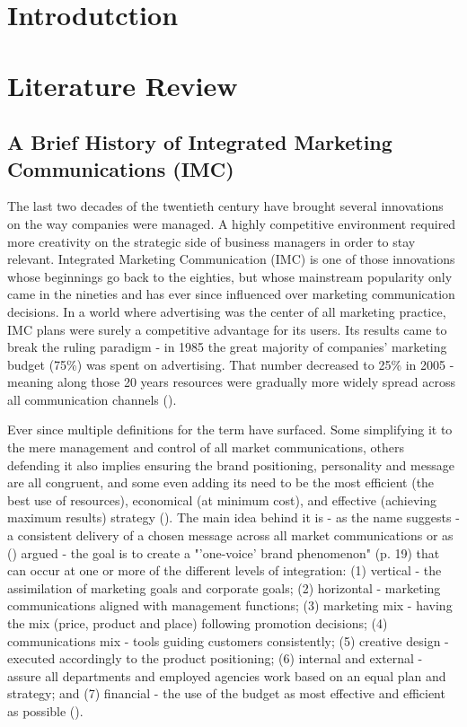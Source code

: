\documentclass[12pt]{article}
\begin{document}
\section{Introdutction}\label{intro}

\newpage	
\section{Literature Review}\label{review}
\subsection{A Brief History of Integrated Marketing Communications (IMC)}\label{IMC}
The last two decades of the twentieth century have brought several innovations on the way companies were managed. A highly competitive environment required more creativity on the strategic side of business managers in order to stay relevant. Integrated Marketing Communication (IMC) is one of those innovations whose beginnings go back to the eighties, but whose mainstream popularity only came in the nineties and has ever since influenced over marketing communication decisions. In a world where advertising was the center of all marketing practice, IMC plans were surely a competitive advantage for its users. Its results came to break the ruling paradigm - in 1985 the great majority  of companies' marketing budget (75\%) was spent on advertising. That number decreased to 25\% in 2005 - meaning along those 20 years resources were gradually more widely spread across all communication channels (\cite{holm}).  

Ever since multiple definitions for the term have surfaced. Some simplifying it to the mere management and control of all market communications, others defending it also implies ensuring the brand positioning, personality and message are all congruent, and some even adding its need to be the most efficient (the best use of resources), economical (at minimum cost), and effective (achieving maximum results) strategy (\cite{smith}). The main idea behind it is - as the name suggests - a consistent delivery of a chosen message across all market communications or as  \citeauthor{kitchen} (\citeyear{kitchen}) argued - the goal is to create a "'one-voice' brand phenomenon" (p. 19) that can occur at one or more of the different levels of integration: (1) vertical - the assimilation of marketing goals and corporate goals; (2) horizontal - marketing communications aligned with management functions; (3) marketing mix - having the mix (price, product and place) following promotion decisions; (4) communications mix - tools guiding customers consistently; (5) creative design - executed accordingly to the product positioning; (6) internal and external - assure all departments and employed agencies work based on an equal plan and strategy; and (7) financial - the use of the budget as most effective and efficient as possible (\cite{smith}). 
\end{document}
